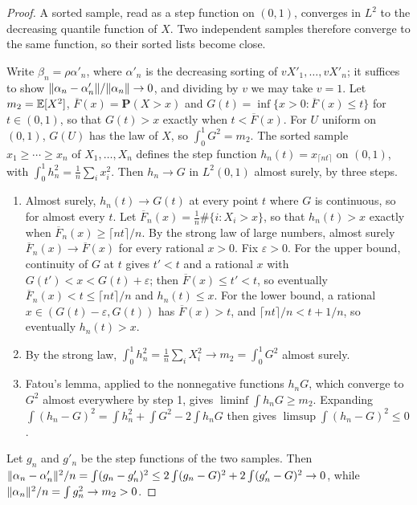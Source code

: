 \begin{proof}
\leanok
{}
A sorted sample, read as a step function on $(0,1)$, converges in $L^2$
to the decreasing quantile function of $X$. Two independent samples
therefore converge to the same function, so their sorted lists become
close.

Write $\beta_n=\rho\alpha'_n$, where $\alpha'_n$ is the decreasing sorting
of $vX'_1,\ldots,vX'_n$; it suffices to show
$\lVert \alpha_n-\alpha'_n\rVert/\lVert \alpha_n\rVert\to0$, and dividing by $v$ we
may take $v=1$. Let $m_2=\mathbb{E}[X^2]$, $\overline F(x)=\mathbf P(X>x)$ and
$G(t)=\inf\{x>0:\overline F(x)\le t\}$ for $t\in(0,1)$, so that
$G(t)>x$ exactly when $t<\overline F(x)$. For $U$ uniform on $(0,1)$,
$G(U)$ has the law of $X$, so $\int_0^1G^2=m_2$. The sorted sample
$x_1\ge\cdots\ge x_n$ of $X_1,\ldots,X_n$ defines the step function
$h_n(t)=x_{\lceil nt\rceil}$ on $(0,1)$, with
$\int_0^1h_n^2=\frac1n\sum_ix_i^2$. Then $h_n\to G$ in $L^2(0,1)$ almost
surely, by three steps.
\begin{enumerate}
\item Almost surely, $h_n(t)\to G(t)$ at every point $t$ where $G$ is
continuous, so for almost every $t$. Let
$\overline F_n(x)=\frac1n\#\{i:X_i>x\}$, so that $h_n(t)>x$ exactly when
$\overline F_n(x)\ge\lceil nt\rceil/n$. By the strong law of large
numbers, almost surely $\overline F_n(x)\to\overline F(x)$ for every
rational $x>0$. Fix $\varepsilon>0$. For the upper bound, continuity of
$G$ at $t$ gives $t'<t$ and a rational $x$ with
$G(t')<x<G(t)+\varepsilon$; then $\overline F(x)\le t'<t$, so eventually
$\overline F_n(x)<t\le\lceil nt\rceil/n$ and $h_n(t)\le x$. For the lower
bound, a rational $x\in(G(t)-\varepsilon,G(t))$ has $\overline F(x)>t$,
and $\lceil nt\rceil/n<t+1/n$, so eventually $h_n(t)>x$.
\item By the strong law,
$\int_0^1h_n^2=\frac1n\sum_iX_i^2\to m_2=\int_0^1G^2$ almost surely.
\item Fatou's lemma, applied to the nonnegative functions $h_nG$, which
converge to $G^2$ almost everywhere by step 1, gives
$\liminf\int h_nG\ge m_2$. Expanding
$\int(h_n-G)^2=\int h_n^2+\int G^2-2\int h_nG$ then gives
$\limsup\int(h_n-G)^2\le0$.
\end{enumerate}
Let $g_n$ and $g'_n$ be the step functions of the two samples. Then
$\lVert \alpha_n-\alpha'_n\rVert^2/n=\int(g_n-g'_n)^2\le2\int(g_n-G)^2+2\int(g'_n-G)^2\to0$,
while $\lVert \alpha_n\rVert^2/n=\int g_n^2\to m_2>0$.
\end{proof}

